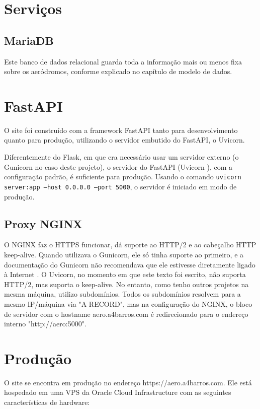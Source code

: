 \section{Serviços}

\subsection{MariaDB}
Este banco de dados relacional guarda toda a informação mais ou menos fixa sobre os aeródromos,
conforme explicado no capítulo de modelo de dados.

\section{FastAPI}

O site foi construído com a framework FastAPI tanto para desenvolvimento quanto para produção, 
utilizando o servidor embutido do FastAPI, o Uvicorn.

Diferentemente do Flask, em que era necessário usar um servidor externo (o Gunicorn no caso 
deste projeto), o servidor do FastAPI (Uvicorn \cite{uvicorn}), com a configuração padrão, é 
suficiente para produção. Usando o comando \texttt{uvicorn server:app --host 0.0.0.0 --port 5000}, 
o servidor é iniciado em modo de produção.

\subsection{Proxy NGINX}
O NGINX faz o HTTPS funcionar, dá suporte ao HTTP/2 e ao cabeçalho HTTP keep-alive. Quando
utilizava o Gunicorn, ele só tinha suporte ao primeiro, e a documentação do Gunicorn não
recomendava que ele estivesse diretamente ligado à Internet \cite{nginx-gunicorn}. O Uvicorn,
no momento em que este texto foi escrito, não suporta HTTP/2, mas suporta o keep-alive. No
entanto, como tenho outros projetos na mesma máquina, utilizo subdomínios. Todos os subdomínios
resolvem para a mesmo IP/máquina via "A RECORD", mas na configuração
do NGINX, o bloco de servidor com o hostname aero.a4barros.com é redirecionado para o
endereço interno "http://aero:5000".

\section{Produção}
O site se encontra em produção no endereço https://aero.a4barros.com. Ele está hospedado em uma VPS
da Oracle Cloud Infrastructure com as seguintes características de hardware:

